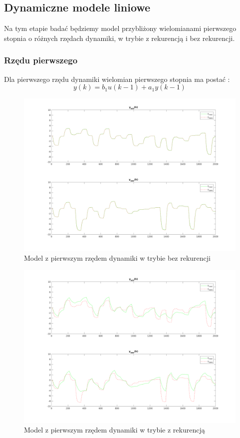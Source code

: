 \documentclass[a4paper, 11pt]{article}
\begin{document}
\subsection{Dynamiczne modele liniowe}
Na tym etapie badać będziemy model przybliżony wielomianami pierwszego stopnia o różnych rzędach dynamiki, w trybie z rekurencją i bez rekurencji. 

\subsubsection{Rzędu pierwszego}
Dla pierwszego rzędu dynamiki wielomian pierwszego stopnia ma postać : 
$$y(k) = b_1u(k-1) + a_1y(k-1)$$
\begin{figure}[H]
\centering
\includegraphics[scale=0.50]{dane_dyn_mod_brek_D_1N_1.png}
\caption{Model z pierwszym rzędem dynamiki w trybie bez rekurencji }
\label{}
\end{figure}
\begin{figure}[H]
\centering
\includegraphics[scale=0.50]{dane_dyn_mod_rek_D_1N_1.png}
\caption{Model z pierwszym rzędem dynamiki w trybie z rekurencją }
\label{}
\end{figure}
\end{document}
